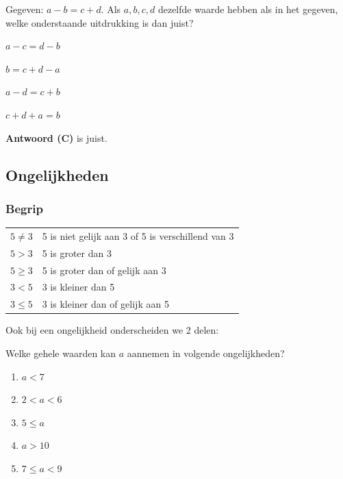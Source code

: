\documentclass{bis}
\begin{document}
\begin{exercise}
Gegeven: $a-b=c+d$. Als $a,b,c,d$ dezelfde waarde hebben als in het gegeven, welke onderstaande
uitdrukking is dan juist?
\begin{meerkeuze}
  \item $a-c=d-b$
  \item $b=c+d-a$
  \item $a-d=c+b$
  \item $c+d+a=b$
\end{meerkeuze}
\end{exercise}

\begin{solution}
\textbf{Antwoord (C)} is juist.
\end{solution}

\subsection{Ongelijkheden}

\subsubsection{Begrip}

\begin{center}
\begin{tabular}{ll}
$5\neq3$ & 5 is niet gelijk aan 3 of 5 is verschillend van 3\\
$5>3$ & 5 is groter dan 3\\
$5\geq3$ & 5 is groter dan of gelijk aan 3\\
$3<5$ & 3 is kleiner dan 5\\
$3\leq5$ & 3 is kleiner dan of gelijk aan 5
\end{tabular}
\end{center}
Ook bij een ongelijkheid onderscheiden we 2 delen:
\begin{center}
\end{center}

\begin{exercise}
Welke gehele waarden kan $a$ aannemen in volgende ongelijkheden?
\begin{enumerate}
  \item $a<7$
  \item $2<a<6$
  \item $5\leq a$
  \item $a>10$
  \item $7\leq a<9$
\end{enumerate}
\end{exercise}
\end{document}
